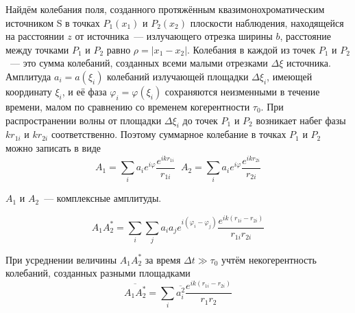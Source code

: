 Найдём колебания поля, созданного протяжённым квазимонохроматическим источником S в точках $P_{1}(x_{1})$ и $P_{2}(x_{2})$ плоскости наблюдения, находящейся на расстоянии $z$ от источника~--- излучающего отрезка ширины $b$, расстояние между точками $P_{1}$ и $P_{2}$ равно $\rho = |x_{1} - x_{2}|$. Колебания в каждой из точек $P_{1}$  и $P_{2}$~--- это сумма колебаний, созданных всеми малыми отрезками $\Delta\xi$  источника. Амплитуда $a_{i} = a(\xi_{i})$ колебаний излучающей площадки $\Delta\xi_{i}$, имеющей координату $\xi_{i}$, и её фаза $\varphi_{i} = \varphi(\xi_{i})$ сохраняются неизменными в течение времени, малом по сравнению со временем когерентности $\tau_{0}$. При распространении волны от площадки $\Delta\xi_{i}$ до точек $P_{1}$ и $P_{2}$ возникает набег фазы $kr_{1i}$ и $kr_{2i}$  соответственно. Поэтому суммарное колебание в точках $P_{1}$ и $P_{2}$ можно записать в виде
\[
    A_{1} = \sum_{i}a_{i}e^{i\varphi}\frac{e^{ikr_{1i}}}{r_{1i}}\;\;A_{2} = \sum_{i}a_{i}e^{i\varphi}\frac{e^{ikr_{2i}}}{r_{2i}}
\]

$A_{1}$ и $A_{2}$~--- комплексные амплитуды.

\[
    A_{1}A_{2}^{*} = \sum_{i}\sum_{j}a_{i}a_{j}e^{i\left( \varphi_{i} - \varphi_{j}\right)}\frac{e^{ik\left(r_{1i} - r_{2i}\right)}}{r_{1i}r_{2i}}
\]

\begin{figure}[ht!]
\end{figure}
При усреднении величины $A_{1}A_{2}^{*}$ за время $\Delta t \gg \tau_{0}$ учтём некогерентность колебаний, созданных разными площадками
\[
    \overline{A_{1}A_{2}^{*}} = \sum_{i}\overline{a_{i}^{2}}\frac{e^{ik\left(r_{1i}-r_{2i}\right)}}{r_{1}r_{2}}
\]

